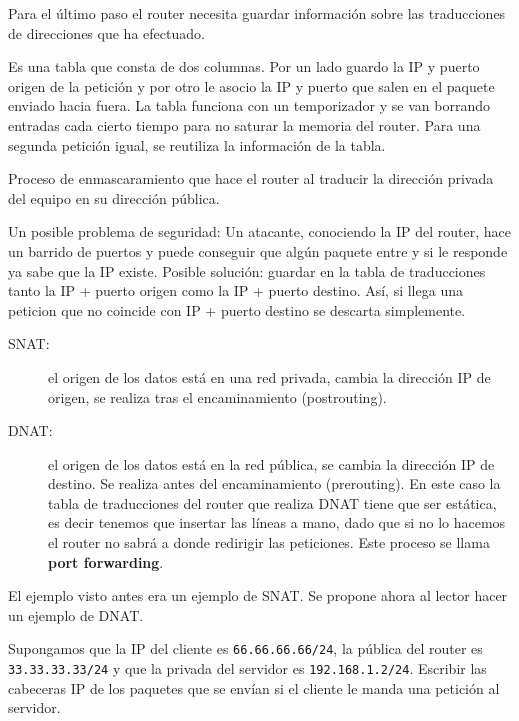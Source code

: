 Para el último paso el router necesita guardar información sobre las traducciones de direcciones que ha efectuado. 
\begin{definicion}
    Es una tabla que consta de dos columnas. Por un lado guardo la IP y puerto origen de la petición y por otro le asocio la IP y puerto que salen en el paquete enviado hacia fuera. 
    La tabla funciona con un temporizador y se van borrando entradas cada cierto tiempo para no saturar la memoria del router. 
    Para una segunda petición igual, se reutiliza la información de la tabla. 
\end{definicion}    

\begin{definicion}[Masquerading]
    Proceso de enmascaramiento que hace el router al traducir la dirección privada del equipo en su dirección pública. 
\end{definicion}

\begin{observacion}
    Un posible problema de seguridad: Un atacante, conociendo la IP del router, hace un barrido de puertos y puede conseguir que algún paquete entre y si le responde ya sabe que la IP existe. 
    Posible solución: guardar en la tabla de traducciones tanto la IP + puerto origen como la IP + puerto destino. Así, si llega una peticion que no coincide con IP + puerto destino se descarta simplemente. 
\end{observacion}

\begin{description}
    \item [SNAT:] el origen de los datos está en una red privada, cambia la dirección IP de origen, se realiza tras el encaminamiento (postrouting).
    \item [DNAT:] el origen de los datos está en la red pública, se cambia la dirección IP de destino. Se realiza antes del encaminamiento (prerouting). En este caso la tabla de traducciones del router que realiza DNAT tiene que ser estática, es decir tenemos que insertar las líneas a mano, dado que si no lo hacemos el router no sabrá a donde redirigir las peticiones. Este proceso se llama \textbf{port forwarding}.
\end{description}

El ejemplo visto antes era un ejemplo de SNAT. Se propone ahora al lector hacer un ejemplo de DNAT\@.

\begin{ejercicio}
    Supongamos que la IP del cliente es \verb|66.66.66.66/24|, la pública del router es \verb|33.33.33.33/24| y que la privada del servidor es \verb|192.168.1.2/24|. Escribir las cabeceras IP de los paquetes que se envían si el cliente le manda una petición al servidor. 
\end{ejercicio}

